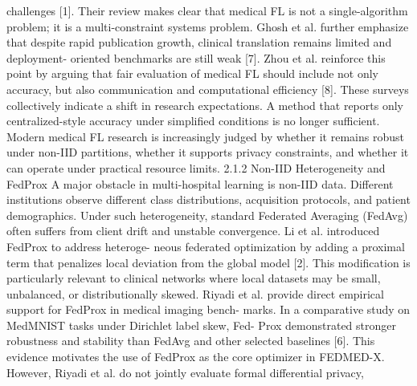 challenges [1].
Their review makes clear that medical FL is not a single-algorithm problem; it is a multi-constraint systems problem. Ghosh et al. further emphasize that despite rapid publication growth, clinical translation remains limited and deployment- oriented benchmarks are still weak [7]. Zhou et al. reinforce this point by arguing that fair evaluation of medical FL should include not only accuracy, but also communication and computational efficiency [8].
These surveys collectively indicate a shift in research expectations. A method that reports only centralized-style accuracy under simplified conditions is no longer sufficient.
Modern medical FL research is increasingly judged by whether it remains robust under non-IID partitions, whether it supports privacy constraints, and whether it can operate under practical resource limits.
2.1.2
Non-IID Heterogeneity and FedProx
A major obstacle in multi-hospital learning is non-IID data.
Different institutions observe different class distributions, acquisition protocols, and patient demographics.
Under such heterogeneity, standard Federated Averaging (FedAvg) often suffers from client drift and unstable convergence. Li et al. introduced FedProx to address heteroge- neous federated optimization by adding a proximal term that penalizes local deviation from the global model [2]. This modification is particularly relevant to clinical networks where local datasets may be small, unbalanced, or distributionally skewed.
Riyadi et al. provide direct empirical support for FedProx in medical imaging bench- marks. In a comparative study on MedMNIST tasks under Dirichlet label skew, Fed-
Prox demonstrated stronger robustness and stability than FedAvg and other selected baselines [6].
This evidence motivates the use of FedProx as the core optimizer in
FEDMED-X. However, Riyadi et al. do not jointly evaluate formal differential privacy,

